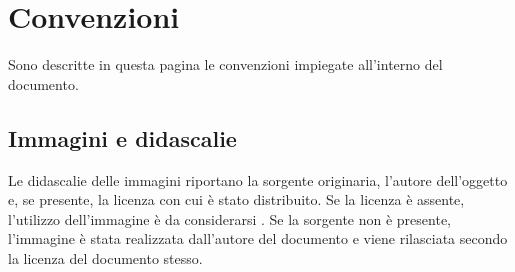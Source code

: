\chapter*{Convenzioni}
Sono descritte in questa pagina le convenzioni impiegate all'interno del documento.
\section*{Immagini e didascalie}
Le didascalie delle immagini riportano la sorgente originaria, l'autore dell'oggetto e, se presente, la licenza con cui è stato distribuito. Se la licenza è assente, l'utilizzo dell'immagine è da considerarsi . Se la sorgente non è presente, l'immagine è stata realizzata dall'autore del documento e viene rilasciata secondo la licenza del documento stesso.

